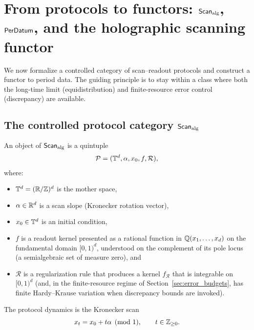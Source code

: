 
\section{From protocols to functors: \texorpdfstring{$\mathsf{Scan}_{\mathrm{alg}}$}{ScanAlg}, \texorpdfstring{$\mathsf{PerDatum}$}{PerDatum}, and the holographic scanning functor}
\label{sec:scan_alg_and_hsp}

We now formalize a controlled category of scan--readout protocols and construct a functor to period data. The guiding principle is to stay within a class where both the long-time limit (equidistribution) and finite-resource error control (discrepancy) are available.

\subsection{The controlled protocol category \texorpdfstring{$\mathsf{Scan}_{\mathrm{alg}}$}{ScanAlg}}
\label{sec:scan_alg_definition}

\begin{definition}
\label{def:scan_alg_object}
An object of $\mathsf{Scan}_{\mathrm{alg}}$ is a quintuple
\begin{equation}
\label{eq:scan_alg_object}
\mathcal{P} = (\mathbb{T}^d,\alpha,x_0,f,\mathcal{R}),
\end{equation}
where:
\begin{itemize}
\item $\mathbb{T}^d=(\mathbb{R}/\mathbb{Z})^d$ is the mother space,
\item $\alpha\in\mathbb{R}^d$ is a scan slope (Kronecker rotation vector),
\item $x_0\in\mathbb{T}^d$ is an initial condition,
\item $f$ is a readout kernel presented as a rational function in $\mathbb{Q}(x_1,\dots,x_d)$ on the fundamental domain $[0,1)^d$, understood on the complement of its pole locus (a semialgebraic set of measure zero), and
\item $\mathcal{R}$ is a regularization rule that produces a kernel $f_{\mathcal{R}}$ that is integrable on $[0,1)^d$ (and, in the finite-resource regime of Section~\ref{sec:error_budgets}, has finite Hardy--Krause variation when discrepancy bounds are invoked).
\end{itemize}
The protocol dynamics is the Kronecker scan
\begin{equation}
\label{eq:kronecker_scan}
x_t = x_0 + t\alpha \pmod{1},\qquad t\in\mathbb{Z}_{\ge 0}.
\end{equation}
\end{definition}

